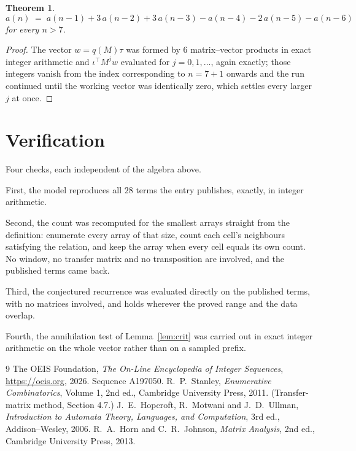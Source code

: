 \documentclass[11pt,a4paper]{article}
\theoremstyle{plain}
\newtheorem{theorem}{Theorem}
\theoremstyle{definition}
\begin{document}
\begin{theorem}
\[
a(n)\;=\;a(n-1) + 3\,a(n-2) + 3\,a(n-3) - a(n-4) - 2\,a(n-5) - a(n-6)
\]
for every $n>7$.
\end{theorem}

\begin{proof}
The vector $w=q(M)\tau$ was formed by $6$ matrix--vector products in exact integer
arithmetic and $\iota^{\!\top}M^{j}w$ evaluated for $j=0,1,\dots$, again exactly; those
integers vanish from the index corresponding to $n=7+1$ onwards and the run continued
until the working vector was identically zero, which settles every larger $j$ at once.
\end{proof}

\section{Verification}

Four checks, each independent of the algebra above.

First, the model reproduces all $28$ terms the entry publishes, exactly, in integer
arithmetic.

Second, the count was recomputed for the smallest arrays straight from the definition:
enumerate every array of that size, count each cell's neighbours satisfying the relation, and
keep the array when every cell equals its own count. No window, no transfer matrix and no
transposition are involved, and the published terms came back.

Third, the conjectured recurrence was evaluated directly on the published terms, with no
matrices involved, and holds wherever the proved range and the data overlap.

Fourth, the annihilation test of Lemma~\ref{lem:crit} was carried out in exact integer
arithmetic on the whole vector rather than on a sampled prefix.

\begin{thebibliography}{9}
 The OEIS Foundation, \emph{The On-Line Encyclopedia of Integer
Sequences}, \url{https://oeis.org}, 2026. Sequence A197050.
 R.~P.~Stanley, \emph{Enumerative Combinatorics}, Volume 1, 2nd ed.,
Cambridge University Press, 2011. (Transfer-matrix method, Section 4.7.)
 J.~E.~Hopcroft, R.~Motwani and J.~D.~Ullman, \emph{Introduction to Automata
Theory, Languages, and Computation}, 3rd ed., Addison--Wesley, 2006.
 R.~A.~Horn and C.~R.~Johnson, \emph{Matrix Analysis}, 2nd ed., Cambridge
University Press, 2013.
\end{thebibliography}
\end{document}
